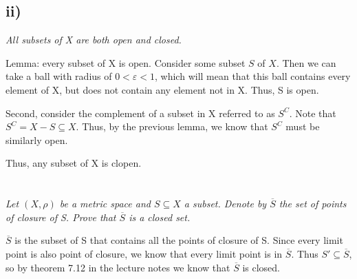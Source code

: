 \documentclass[]{article}
\begin{document}
		\subsection*{ii)}
			\textit{All subsets of X are both open and closed.}


			Lemma: every subset of X is open. Consider some subset $S$ of $X$. Then we can take a ball with radius of $0 < \varepsilon < 1$, which will mean that this ball contains every element of X, but does not contain any element not in X. Thus, S is open. 

			Second, consider the complement of a subset in X referred to as $S^C$. Note that $S^C = X - S \subseteq X$. Thus, by the previous lemma, we know that $S^C$ must be similarly open. 

			Thus, any subset of X is clopen.  


	\section{}
		\textit{Let $(X, \rho)$ be a metric space and $S \subseteq X$ a subset. Denote by $\overline{S}$ the set of points of closure of S. Prove that $\overline{S}$ is a closed set.}


		$\overline{S}$ is the subset of S that contains all the points of closure of S. Since every limit point is also point of closure, we know that every limit point is in $\overline{S}$. Thus $S' \subseteq \overline{S}$, so by theorem 7.12 in the lecture notes we know that $\overline{S}$ is closed. 
\end{document}
